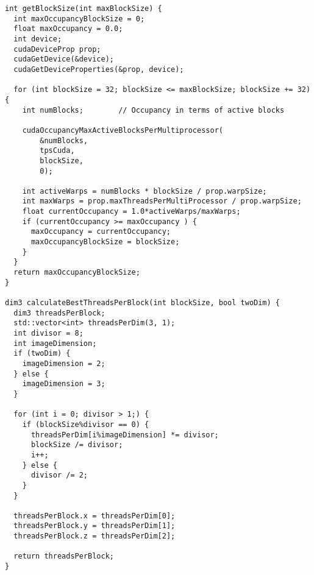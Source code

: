 \begin{lstlisting}[label={code:occupancy}, caption={Funções usadas para calcular a ocupação máxima dos processadores da GPU}]
  int getBlockSize(int maxBlockSize) {
  int maxOccupancyBlockSize = 0;
  float maxOccupancy = 0.0;
  int device;
  cudaDeviceProp prop;
  cudaGetDevice(&device);
  cudaGetDeviceProperties(&prop, device);

  for (int blockSize = 32; blockSize <= maxBlockSize; blockSize += 32) {
    int numBlocks;        // Occupancy in terms of active blocks

    cudaOccupancyMaxActiveBlocksPerMultiprocessor(
        &numBlocks,
        tpsCuda,
        blockSize,
        0);

    int activeWarps = numBlocks * blockSize / prop.warpSize;
    int maxWarps = prop.maxThreadsPerMultiProcessor / prop.warpSize;
    float currentOccupancy = 1.0*activeWarps/maxWarps;
    if (currentOccupancy >= maxOccupancy ) {
      maxOccupancy = currentOccupancy;
      maxOccupancyBlockSize = blockSize;
    }
  }
  return maxOccupancyBlockSize;
}

dim3 calculateBestThreadsPerBlock(int blockSize, bool twoDim) {
  dim3 threadsPerBlock;
  std::vector<int> threadsPerDim(3, 1);
  int divisor = 8;
  int imageDimension;
  if (twoDim) {
    imageDimension = 2;
  } else {
    imageDimension = 3;
  }

  for (int i = 0; divisor > 1;) {
    if (blockSize%divisor == 0) {
      threadsPerDim[i%imageDimension] *= divisor;
      blockSize /= divisor;
      i++;
    } else {
      divisor /= 2;
    }
  }

  threadsPerBlock.x = threadsPerDim[0];
  threadsPerBlock.y = threadsPerDim[1];
  threadsPerBlock.z = threadsPerDim[2];

  return threadsPerBlock;
}
\end{lstlisting}
